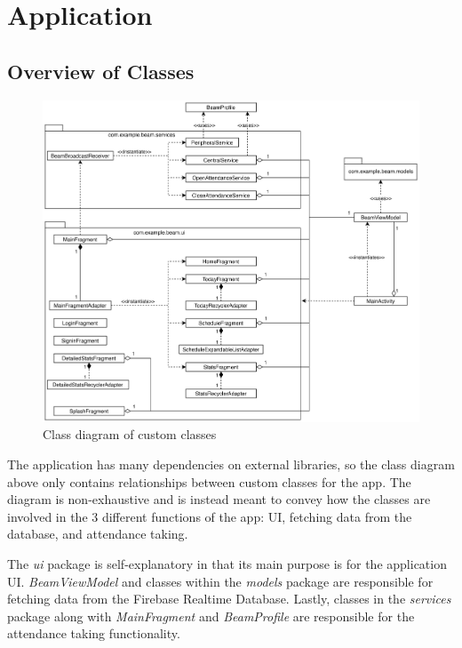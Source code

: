 \documentclass[../report.tex]{subfiles}
\begin{document}
\section{Application}
\subsection{Overview of Classes}
\begin{figure}[H]
	\centering
	\includegraphics[width=\linewidth]{../images/07/02-01-class-diagram.png}
	\caption{Class diagram of custom classes}
	\label{fig:07-02-01-class-diagram}
\end{figure}
The application has many dependencies on external libraries, so the class diagram above only contains relationships between custom classes for the app. The diagram is non-exhaustive and is instead meant to convey how the classes are involved in the 3 different functions of the app: UI, fetching data from the database, and attendance taking.

The \textit{ui} package is self-explanatory in that its main purpose is for the application UI. \textit{BeamViewModel} and classes within the \textit{models} package are responsible for fetching data from the Firebase Realtime Database. Lastly, classes in the \textit{services} package along with \textit{MainFragment} and \textit{BeamProfile} are responsible for the attendance taking functionality. 
\end{document}
